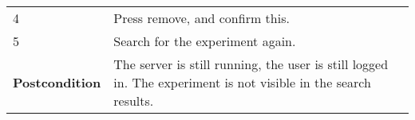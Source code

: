 \begin{longtable}[c]{@{}ll@{}}
\begin{minipage}[t]{0.31\columnwidth}
4
\strut\end{minipage} &
\begin{minipage}[t]{0.63\columnwidth}\raggedright\strut
Press remove, and confirm this.
\strut\end{minipage}\tabularnewline
\begin{minipage}[t]{0.31\columnwidth}\raggedright\strut
5
\strut\end{minipage} &
\begin{minipage}[t]{0.63\columnwidth}\raggedright\strut
Search for the experiment again.
\strut\end{minipage}\tabularnewline
\begin{minipage}[t]{0.31\columnwidth}\raggedright\strut
\textbf{Postcondition}
\strut\end{minipage} &
\begin{minipage}[t]{0.63\columnwidth}\raggedright\strut
The server is still running, the user is still logged in. The experiment
is not visible in the search results.
\strut\end{minipage}\tabularnewline
\bottomrule
\end{longtable}

